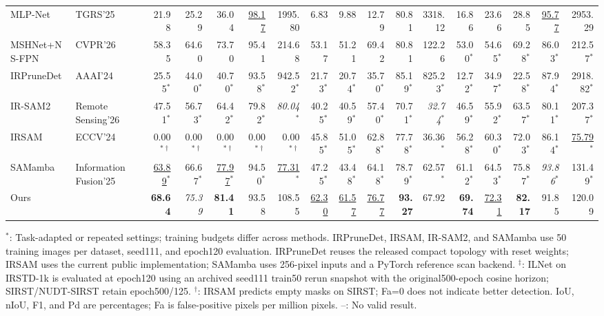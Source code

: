 \begin{table}[!t]
{\begin{tabular}{ll|rrrrr|rrrrr|rrrrr}
MLP-Net & TGRS'25 & 21.98 & 25.29 & 36.04 & \underline{98.17} & 1995.80 & 6.83 & 9.88 & 12.79 & 80.81 & 3318.12 & 16.86 & 23.66 & 28.85 & \underline{95.77} & 2953.29 \\
MSHNet+NS-FPN & CVPR'26 & 58.35 & 64.60 & 73.70 & 95.41 & 214.68 & 53.17 & 51.21 & 69.42 & 80.81 & 122.26 & 53.00$^{*}$ & 54.65$^{*}$ & 69.28$^{*}$ & 86.03$^{*}$ & 212.57$^{*}$ \\
IRPruneDet & AAAI'24 & 25.55$^{*}$ & 44.00$^{*}$ & 40.70$^{*}$ & 93.58$^{*}$ & 942.52$^{*}$ & 21.73$^{*}$ & 20.74$^{*}$ & 35.70$^{*}$ & 85.19$^{*}$ & 825.23$^{*}$ & 12.72$^{*}$ & 34.97$^{*}$ & 22.58$^{*}$ & 87.94$^{*}$ & 2918.82$^{*}$ \\
IR-SAM2 & Remote Sensing'26 & 47.51$^{*}$ & 56.73$^{*}$ & 64.42$^{*}$ & 79.82$^{*}$ & \textit{80.04}$^{*}$ & 40.25$^{*}$ & 40.59$^{*}$ & 57.40$^{*}$ & 70.71$^{*}$ & \textit{32.74}$^{*}$ & 46.59$^{*}$ & 55.92$^{*}$ & 63.57$^{*}$ & 80.11$^{*}$ & 207.37$^{*}$ \\
IRSAM & ECCV'24 & 0.00$^{*\dagger}$ & 0.00$^{*\dagger}$ & 0.00$^{*\dagger}$ & 0.00$^{*\dagger}$ & 0.00$^{*\dagger}$ & 45.85$^{*}$ & 51.05$^{*}$ & 62.88$^{*}$ & 77.78$^{*}$ & 36.36$^{*}$ & 56.28$^{*}$ & 60.30$^{*}$ & 72.03$^{*}$ & 86.14$^{*}$ & \underline{75.79}$^{*}$ \\
SAMamba & Information Fusion'25 & \underline{63.89}$^{*}$ & 66.67$^{*}$ & \underline{77.97}$^{*}$ & 94.50$^{*}$ & \underline{77.31}$^{*}$ & 47.25$^{*}$ & 43.48$^{*}$ & 64.18$^{*}$ & 78.79$^{*}$ & 62.57$^{*}$ & 61.12$^{*}$ & 64.53$^{*}$ & 75.87$^{*}$ & \textit{93.86}$^{*}$ & 131.49$^{*}$ \\
\hline
Ours &  & \textbf{68.64} & \textit{75.39} & \textbf{81.41} & 93.58 & 108.55 & \underline{62.30} & \underline{61.57} & \underline{76.77} & \textbf{93.27} & 67.92 & \textbf{69.74} & \underline{72.31} & \textbf{82.17} & 91.85 & 120.09 \\
\hline
\end{tabular}}
\endgroup
\par\smallskip
\noindent\parbox{\linewidth}{\raggedright\footnotesize $^{*}$: Task-adapted or repeated settings; training budgets differ across methods. IRPruneDet, IRSAM, IR-SAM2, and SAMamba use 50 training images per dataset, seed111, and epoch120 evaluation. IRPruneDet reuses the released compact topology with reset weights; IRSAM uses the current public implementation; SAMamba uses 256-pixel inputs and a PyTorch reference scan backend. $^{\ddagger}$: ILNet on IRSTD-1k is evaluated at epoch120 using an archived seed111 train50 rerun snapshot with the original500-epoch cosine horizon; SIRST/NUDT-SIRST retain epoch500/125. $^{\dagger}$: IRSAM predicts empty masks on SIRST; Fa=0 does not indicate better detection. IoU, nIoU, F1, and Pd are percentages; Fa is false-positive pixels per million pixels. --: No valid result.\par}
\end{table}
